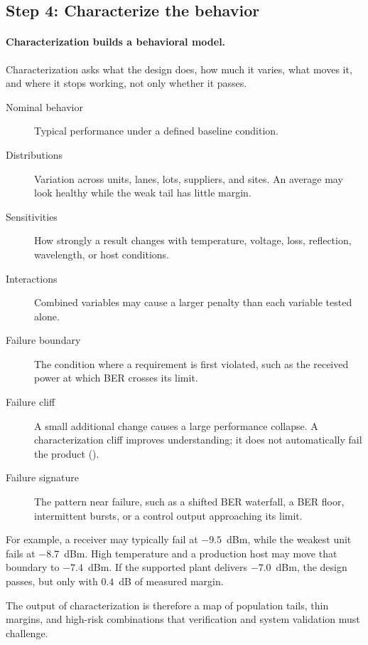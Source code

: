 \subsection{Step 4: Characterize the behavior}
\label{sec:ladder-characterization}

\paragraph{Characterization builds a behavioral model.}
Characterization asks what the design does, how much it varies, what moves it,
and where it stops working, not only whether it passes.

\begin{description}
\item[Nominal behavior] Typical performance under a defined baseline condition.
\item[Distributions] Variation across units, lanes, lots, suppliers, and sites.
      An average may look healthy while the weak tail has little margin.
\item[Sensitivities] How strongly a result changes with temperature, voltage,
      loss, reflection, wavelength, or host conditions.
\item[Interactions] Combined variables may cause a larger penalty than each
      variable tested alone.
\item[Failure boundary] The condition where a requirement is first violated,
      such as the received power at which BER crosses its limit.
\item[Failure cliff] A small additional change causes a large performance
      collapse. A characterization cliff improves understanding; it does not
      automatically fail the product ().
\item[Failure signature] The pattern near failure, such as a shifted BER
      waterfall, a BER floor, intermittent bursts, or a control output
      approaching its limit.
\end{description}

For example, a receiver may typically fail at $-9.5$~dBm, while the weakest unit
fails at $-8.7$~dBm. High temperature and a production host may move that
boundary to $-7.4$~dBm. If the supported plant delivers $-7.0$~dBm, the design
passes, but only with $0.4$~dB of measured margin.

The output of characterization is therefore a map of population tails, thin
margins, and high-risk combinations that verification and system validation
must challenge.

